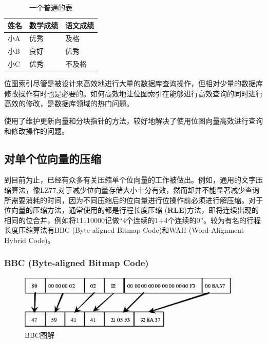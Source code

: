 \documentclass[11pt, a4paper]{article}
\begin{document}
  \begin{table}[H]
    \centering
    \label{tb:table} \caption{一个普通的表}
    \begin{tabular}{|l|l|l|}
      \hline
      姓名 & 数学成绩 & 语文成绩 \\ \hline
      小A & 优秀   & 及格   \\ \hline
      小B & 良好   & 优秀   \\ \hline
      小C & 优秀   & 不及格 \\ \hline
    \end{tabular}
  \end{table}

  位图索引尽管是被设计来高效地进行大量的数据库查询操作，但相对少量的数据库修改操作有时也是必要的。如何高效地让位图索引在能够进行高效查询的同时进行高效的修改，是数据库领域的热门问题。

  \cite{art1}使用了维护更新向量和分块指针的方法，较好地解决了使用位图向量高效进行查询和修改操作的问题。

  \subsection{对单个位向量的压缩}

  到目前为止，已经有众多有关压缩单个位向量的工作被做出。例如，通用的文字压缩算法，像LZ77,对于减少位向量存储大小十分有效，然而却并不能显著减少查询所需要消耗的时间，因为不同压缩后的位向量进行位操作前必须进行解压缩。对于位向量的压缩方法，通常使用的都是行程长度压缩 ({\bf RLE})方法，即将连续出现的相同的位合并，例如将11110000记做“4个连续的1+4个连续的0”。较为有名的行程长度压缩算法有BBC (Byte-aligned Bitmap Code)和WAH (Word-Alignment Hybrid Code)。

  \subsubsection{BBC (Byte-aligned Bitmap Code)}

  \begin{figure}[H]
    \begin{center}
      \includegraphics[width=5in]{img/bbc.png}
      \caption{BBC图解}\label{fig:bbc}
    \end{center}
  \end{figure}
\end{document}
